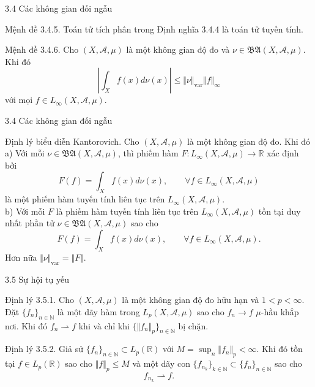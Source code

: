 \documentclass[notheorems,envcountsect,hyperref=unicode]{beamer}
\newcommand{\R}{\mathbb R}
\newcommand{\N}{\mathbb N}
\def\A{\mathcal{A}}
\def\R{\mathbb{R}}
\def\N{\mathbb{N}}
\def\Lpp{\mathit{L_p}}
\def\Loo{\mathit{L_{\infty}}}
\def\m{\mu}
\def\disint{\displaystyle\int}
\def\hkn{hầu khắp nơi}
\def\kgdd{(X,\A,\mu)}
\begin{document}
\begin{frame}{3.4 Các không gian đối ngẫu }
\begin{block}{\textnormal{Mệnh đề 3.4.5.}}
Toán tử tích phân trong Định nghĩa 3.4.4 là toán tử tuyến tính.
\end{block}
\begin{block}{\textnormal{Mệnh đề 3.4.6.}}
Cho $\kgdd$ là một không gian độ đo và $\nu\in\mathfrak{BA}\kgdd$. Khi đó
$$\left\vert \disint_X f(x)d\nu(x) \right\vert\leq \Vert \nu\Vert_{\text{var}}\Vert f\Vert_{\infty}$$
với mọi $f\in\Loo\kgdd.$
\end{block}
\end{frame}

\begin{frame}{3.4 Các không gian đối ngẫu }
\begin{block}{\textnormal{Định lý biểu diễn Kantorovich.}}
Cho $\kgdd$ là một không gian độ đo. Khi đó\\
a) Với mỗi $\nu\in\mathfrak{BA}\kgdd$, thì phiếm hàm $F:\Loo\kgdd\to \R$ xác định bởi
$$F(f)=\disint_X f(x)d\nu(x),\qquad\forall f\in \Loo\kgdd$$
là một phiếm hàm tuyến tính liên tục trên $\Loo\kgdd$.\\
b) Với mỗi $F$ là phiếm hàm tuyến tính liên tục trên $\Loo\kgdd$ tồn tại duy nhất phần tử $\nu\in\mathfrak{BA}\kgdd$ sao cho
$$F(f)=\disint_X f(x)d\nu(x),\qquad\forall f\in \Loo\kgdd.$$
Hơn nữa $\Vert \nu\Vert_{\text{var}}=\Vert F\Vert.$ 
\end{block}
\end{frame}

\begin{frame}{3.5 Sự hội tụ yếu }

\begin{block}{\textnormal{Định lý 3.5.1.}}
Cho $\kgdd$ là một không gian độ đo hữu hạn và $1<p<\infty$. Đặt $\lbrace f_n\rbrace_{n\in\N}$ là một dãy hàm trong $\Lpp\kgdd$ sao cho $f_n\rightarrow f$ $\m$-\hkn. Khi đó $f_n\rightharpoonup f$ khi và chỉ khi $\lbrace\Vert f_n\Vert_p\rbrace_{n\in\N}$ bị chặn.
\end{block}
\pause
\begin{block}{\textnormal{Định lý 3.5.2.}}
Giả sử $\lbrace f_n\rbrace_{n\in\N}\subset\Lpp(\R)$ với $M=\sup_n\Vert f_n\Vert_p<\infty$. Khi đó tồn tại $f\in\Lpp(\R)$ sao cho $\Vert f\Vert_p\leq M$ và một dãy con $\lbrace f_{n_k}\rbrace_{k\in\N}\subset \lbrace f_n\rbrace_{n\in\N}$ sao cho $$f_{n_k}\rightharpoonup f.$$
\end{block}
\end{frame}
\end{document}
